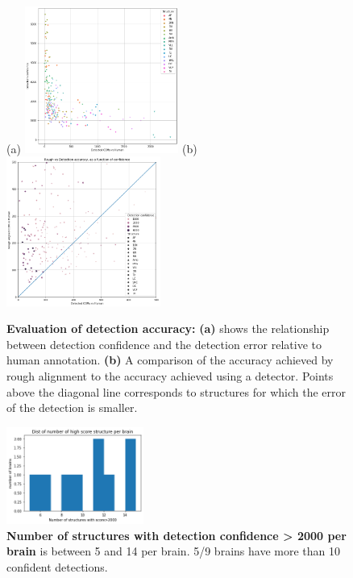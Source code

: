 \documentclass[11pt]{article}
\begin{document}
\begin{figure}[t]
  (a) \includegraphics[width=0.45\textwidth]{figures/ErrorVSconfidence.png}
  \hspace{1cm}
  (b)\includegraphics[width=0.45\textwidth]{figures/RoughVSdetection.png}
  \caption{\label{fig:structureAccuracy} {\bf Evaluation of detection
      accuracy:} {\bf (a)} shows the relationship between detection
    confidence and the detection error relative to human annotation.
    {\bf (b)} A comparison of the accuracy achieved by rough alignment
    to the accuracy achieved using a detector. Points above the
    diagonal line corresponds to structures for which the error of the
    detection is smaller.}
\end{figure}

\begin{figure}[t]
  \includegraphics[width=0.4\textwidth]{figures/PerBrainStrongDetections.png}
  \caption{\label{fig:ConfidentStructureHist} {\bf Number of
      structures with detection confidence > 2000 per brain} is
    between 5 and 14 per brain. 5/9 brains have more than 10 confident detections.}
\end{figure}
\end{document}
